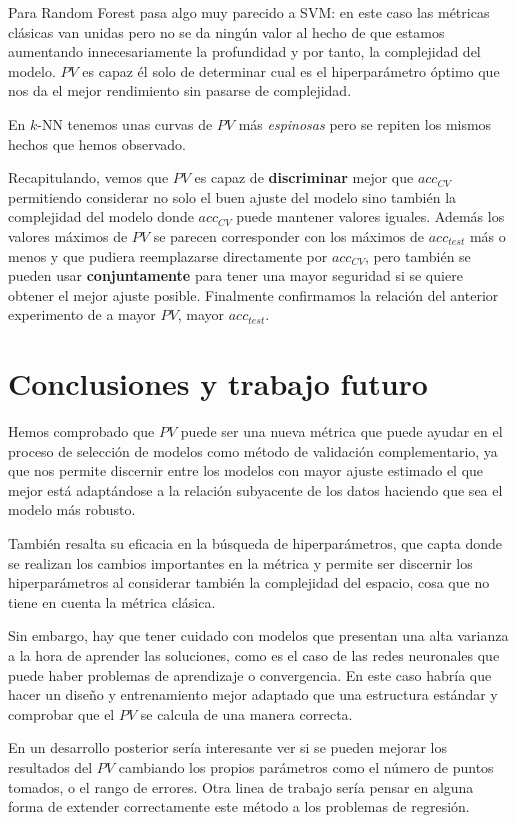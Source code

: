 Para Random Forest pasa algo muy parecido a SVM: en este caso las métricas clásicas van unidas pero no se da ningún valor al hecho de que estamos aumentando innecesariamente la profundidad y por tanto, la complejidad del modelo. $PV$ es capaz él solo de determinar cual es el hiperparámetro óptimo que nos da el mejor rendimiento sin pasarse de complejidad.

En $k$-NN tenemos unas curvas de $PV$ más \emph{espinosas} pero se repiten los mismos hechos que hemos observado.

Recapitulando, vemos que $PV$ es capaz de \textbf{discriminar} mejor que $acc_{CV}$ permitiendo considerar no solo el buen ajuste del modelo sino también la complejidad del modelo donde $acc_{CV}$ puede mantener valores iguales. Además los valores máximos de $PV$ se parecen corresponder con los máximos de $acc_{test}$ más o menos y que pudiera reemplazarse directamente por $acc_{CV}$, pero también se pueden usar \textbf{conjuntamente} para tener una mayor seguridad si se quiere obtener el mejor ajuste posible. Finalmente confirmamos la relación del anterior experimento de a mayor $PV$, mayor $acc_{test}$.

\chapter{Conclusiones y trabajo futuro}

Hemos comprobado que $PV$ puede ser una nueva métrica que puede ayudar en el proceso de selección de modelos como método de validación complementario, ya que nos permite discernir entre los modelos con mayor ajuste estimado el que mejor está adaptándose a la relación subyacente de los datos haciendo que sea el modelo más robusto.

También resalta su eficacia en la búsqueda de hiperparámetros, que capta donde se realizan los cambios importantes en la métrica y permite ser discernir los hiperparámetros al considerar también la complejidad del espacio, cosa que no tiene en cuenta la métrica clásica.

Sin embargo, hay que tener cuidado con modelos que presentan una alta varianza a la hora de aprender las soluciones, como es el caso de las redes neuronales que puede haber problemas de aprendizaje o convergencia. En este caso habría que hacer un diseño y entrenamiento mejor adaptado que una estructura estándar y comprobar que el $PV$ se calcula de una manera correcta.

En un desarrollo posterior sería interesante ver si se pueden mejorar los resultados del $PV$ cambiando los propios parámetros como el número de puntos tomados, o el rango de errores. Otra linea de trabajo sería pensar en alguna forma de extender correctamente este método a los problemas de regresión.

\endinput

